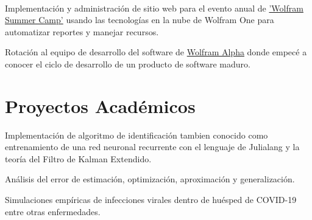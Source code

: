 \documentclass[]{tex/deedy-resume-openfont}
\begin{document}
\begin{minipage}[t]{0.66\textwidth}
\\
\vspace{\topsep} %
\begin{tightemize}
\item Implementación y administración de sitio web para el evento anual de \href{https://education.wolfram.com/summer-camp/}{'Wolfram Summer Camp'} usando las tecnologías en la nube de Wolfram One para automatizar reportes y manejar recursos.
\item Rotación al equipo de desarrollo del software de \href{https://www.wolframalpha.com/}{Wolfram Alpha} donde empecé a conocer el ciclo de desarrollo de un producto de software maduro.
\end{tightemize}
\sectionsep


\section{Proyectos Académicos}

\vspace{\topsep} %
\begin{tightemize}
\item Implementación de algoritmo de identificación tambien conocido como entrenamiento de una red neuronal recurrente con el lenguaje de Julialang y la teoría del Filtro de Kalman Extendido.
\item Análisis del error de estimación, optimización, aproximación y generalización.
\item Simulaciones empíricas de infecciones virales dentro de huésped de COVID-19 entre otras enfermedades.
\end{tightemize}
\sectionsep


\end{minipage}
\end{document}
